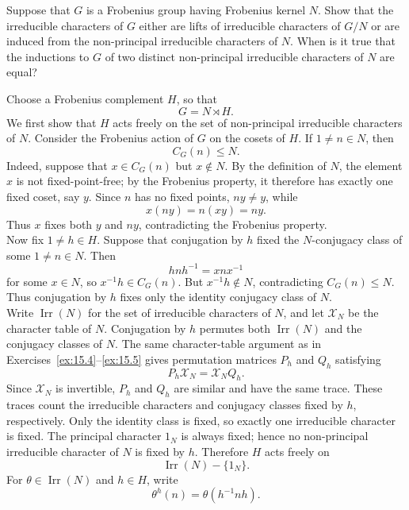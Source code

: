 \documentclass[../Odyssey_Project.tex]{subfiles}
\begin{document}
\begin{exercise}
\label{ex:16.7}
Suppose that $G$ is a Frobenius group having Frobenius kernel $N$. Show that the irreducible characters of $G$ either are lifts of irreducible characters of $G/N$ or are induced from the non-principal irreducible characters of $N$. When is it true that the inductions to $G$ of two distinct non-principal irreducible characters of $N$ are equal?
\end{exercise}
\begin{solution}
    Choose a Frobenius complement $H$, so that
    \[
        G=N\rtimes H.
    \]
    We first show that $H$ acts freely on the set of non-principal irreducible characters of $N$. Consider the Frobenius action of $G$ on the cosets of $H$. If $1\neq n\in N$, then
    \[
        C_G(n)\leq N.
    \]
    Indeed, suppose that $x\in C_G(n)$ but $x\notin N$. By the definition of $N$, the element $x$ is not fixed-point-free; by the Frobenius property, it therefore has exactly one fixed coset, say $y$. Since $n$ has no fixed points, $ny\neq y$, while
    \[
        x(ny)=n(xy)=ny.
    \]
    Thus $x$ fixes both $y$ and $ny$, contradicting the Frobenius property.\\
    Now fix $1\neq h\in H$. Suppose that conjugation by $h$ fixed the $N$-conjugacy class of some $1\neq n\in N$. Then
    \[
        hnh^{-1}=xnx^{-1}
    \]
    for some $x\in N$, so $x^{-1}h\in C_G(n)$. But $x^{-1}h\notin N$, contradicting $C_G(n)\leq N$. Thus conjugation by $h$ fixes only the identity conjugacy class of $N$.\\
    Write $\operatorname{Irr}(N)$ for the set of irreducible characters of $N$, and let $\mathcal{X}_N$ be the character table of $N$. Conjugation by $h$ permutes both $\operatorname{Irr}(N)$ and the conjugacy classes of $N$. The same character-table argument as in Exercises~\ref{ex:15.4}--\ref{ex:15.5} gives permutation matrices $P_h$ and $Q_h$ satisfying
    \[
        P_h\mathcal{X}_N=\mathcal{X}_NQ_h.
    \]
    Since $\mathcal{X}_N$ is invertible, $P_h$ and $Q_h$ are similar and have the same trace. These traces count the irreducible characters and conjugacy classes fixed by $h$, respectively. Only the identity class is fixed, so exactly one irreducible character is fixed. The principal character $1_N$ is always fixed; hence no non-principal irreducible character of $N$ is fixed by $h$. Therefore $H$ acts freely on
    \[
        \operatorname{Irr}(N)-\{1_N\}.
    \]
    For $\theta\in\operatorname{Irr}(N)$ and $h\in H$, write
    \[
        \theta^h(n)=\theta(h^{-1}nh).
\]
\end{solution}
\end{document}
